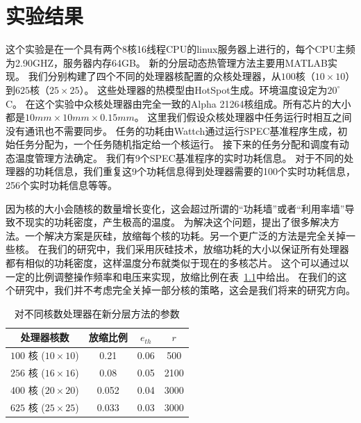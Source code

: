 
\chapter{实验结果}\label{sec:exp}

这个实验是在一个具有两个8核16线程CPU的linux服务器上进行的，每个CPU主频为2.90GHZ，服务器内存64GB。
新的分层动态热管理方法主要用MATLAB实现。
我们分别构建了四个不同的处理器核配置的众核处理器，从$100$核（$10 \times 10$）到$625$核（$25 \times 25$）。
这些处理器的热模型由HotSpot生成。环境温度设定为$20^{\circ}$C。
在这个实验中众核处理器由完全一致的Alpha 21264核组成。所有芯片的大小都是$10mm \times 10mm \times 0.15mm$。
这里我们假设众核处理器中任务运行时相互之间没有通讯也不需要同步。
任务的功耗由Wattch通过运行SPEC基准程序生成，初始任务分配为，一个任务随机指定给一个核运行。
接下来的任务分配和调度有动态温度管理方法确定。
我们有9个SPEC基准程序的实时功耗信息。
对于不同的处理器的功耗信息，我们重复这9个功耗信息得到处理器需要的100个实时功耗信息，256个实时功耗信息等等。

因为核的大小会随核的数量增长变化，这会超过所谓的“功耗墙”或者“利用率墙”导致不现实的功耗密度，产生极高的温度。
为解决这个问题，提出了很多解决方法。一个解决方案是灰硅，放缩每个核的功耗。另一个更广泛的方法是完全关掉一些核\cite{Taylor:MICRO'13,Shafique:DAC'14}。
在我们的研究中，我们采用灰硅技术，放缩功耗的大小以保证所有处理器都有相似的功耗密度，这样温度分布就类似于现在的多核芯片。
这个可以通过以一定的比例调整操作频率和电压来实现，放缩比例在表~\ref{tab:param}中给出。
在我们的这个研究中，我们并不考虑完全关掉一部分核的策略，这会是我们将来的研究方向。
\begin{table}[H]
\centering
\caption{对不同核数处理器在新分层方法的参数}\label{tab:param}{
 \begin{tabular}{|c|c|c|c|}
 \hline
 \hline
 处理器核数 &  放缩比例 & $e_{th}$ & $r$ \\
 \hline 
 \hline
 $100$ 核 ($10 \times 10$) & 0.21 & 0.06 & 500  \\
 \hline
 $256$ 核 ($16 \times 16$) & 0.08 & 0.05 & 2100 \\
 \hline
 $400$ 核 ($20 \times 20$) & 0.052 & 0.04 & 3000 \\
 \hline
 $625$ 核 ($25 \times 25$) & 0.033 & 0.03 & 3000 \\
 \hline
 \hline
 \end{tabular}
 }
 \end{table}
 
